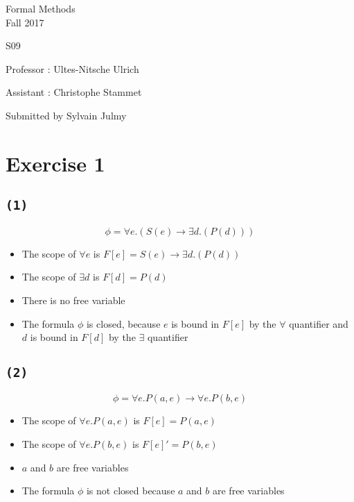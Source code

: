 \documentclass[a4paper,11pt]{report}
\author{Sylvain Julmy}
\date{\today}
\begin{document}
\begin{center}
  \large{
    Formal Methods\\
    Fall 2017
  }
  
  \noindent\makebox[\linewidth]{\rule{\linewidth}{0.4pt}}
  S09
  \noindent\makebox[\linewidth]{\rule{\linewidth}{0.4pt}}

  \begin{flushleft}
    Professor : Ultes-Nitsche Ulrich

    Assistant : Christophe Stammet
  \end{flushleft}

  
  \noindent\makebox[\linewidth]{\rule{\linewidth}{0.4pt}}

  Submitted by Sylvain Julmy
  
  \noindent\makebox[\linewidth]{\rule{\textwidth}{1pt}}
\end{center}

\section*{Exercise 1}

\subsection*{\texttt{(1)}}

\[
  \phi = \forall e.(S(e) \to \exists d.(P(d)))
\]

\begin{itemize}
\item The scope of $\forall e$ is $F[e] = S(e) \to \exists d.(P(d))$
\item The scope of $\exists d$ is $F[d] = P(d)$
\item There is no free variable
\item The formula $\phi$ is closed, because $e$ is bound in $F[e]$ by the
  $\forall$ quantifier and $d$ is bound in $F[d]$ by the $\exists$ quantifier
\end{itemize}

\subsection*{\texttt{(2)}}

\[
  \phi = \forall e.P(a,e) \to \forall e.P(b,e)
\]

\begin{itemize}
\item The scope of $\forall e.P(a,e)$ is $F[e] = P(a,e)$
\item The scope of $\forall e.P(b,e)$ is $F[e]' = P(b,e)$
\item $a$ and $b$ are free variables
\item The formula $\phi$ is not closed because $a$ and $b$ are free variables
\end{itemize}
\end{document}
